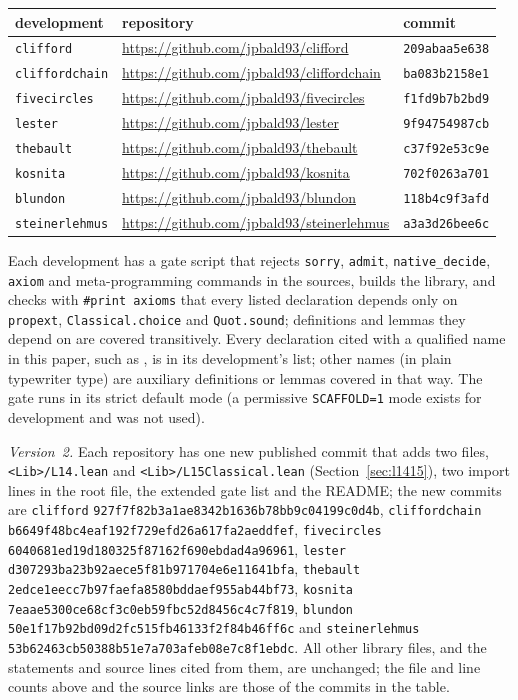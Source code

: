 \documentclass[11pt]{article}
\theoremstyle{definition}
\theoremstyle{remark}
\newcommand{\lean}[1]{\texttt{#1}}
\begin{document}
\begin{center}\small
\begin{tabular}{lll}
\toprule
development & repository & commit\\
\midrule
\lean{clifford} & \url{https://github.com/jpbald93/clifford} & \texttt{209abaa5e638}\\
\lean{cliffordchain} & \url{https://github.com/jpbald93/cliffordchain} & \texttt{ba083b2158e1}\\
\lean{fivecircles} & \url{https://github.com/jpbald93/fivecircles} & \texttt{f1fd9b7b2bd9}\\
\lean{lester} & \url{https://github.com/jpbald93/lester} & \texttt{9f94754987cb}\\
\lean{thebault} & \url{https://github.com/jpbald93/thebault} & \texttt{c37f92e53c9e}\\
\lean{kosnita} & \url{https://github.com/jpbald93/kosnita} & \texttt{702f0263a701}\\
\lean{blundon} & \url{https://github.com/jpbald93/blundon} & \texttt{118b4c9f3afd}\\
\lean{steinerlehmus} & \url{https://github.com/jpbald93/steinerlehmus} & \texttt{a3a3d26bee6c}\\
\bottomrule
\end{tabular}
\end{center}
Each development has a gate script that rejects \lean{sorry}, \lean{admit}, \lean{native\_decide},
\lean{axiom} and meta-programming commands in the sources, builds the library, and checks with
\lean{\#print axioms} that every listed declaration depends only on \lean{propext},
\lean{Classical.choice} and \lean{Quot.sound}; definitions and lemmas they depend on are covered
transitively. Every declaration cited with a qualified name in this paper, such as , is in its development's list;
other names (in plain typewriter type) are auxiliary definitions or lemmas covered in that way.
The gate runs in its strict default mode (a permissive \lean{SCAFFOLD=1} mode exists for development
and was not used).

\emph{Version~2.} Each repository has one new published commit that adds two files, \lean{<Lib>/L14.lean} and
\lean{<Lib>/L15Classical.lean} (Section~\ref{sec:l1415}), two import lines in the root file, the
extended gate list and the README; the new commits are \lean{clifford} \texttt{927f7f82b3a1ae8342b1636b78bb9c04199c0d4b}, \lean{cliffordchain} \texttt{b6649f48bc4eaf192f729efd26a617fa2aeddfef}, \lean{fivecircles} \texttt{6040681ed19d180325f87162f690ebdad4a96961}, \lean{lester} \texttt{d307293ba23b92aece5f81b971704e6e11641bfa}, \lean{thebault} \texttt{2edce1eecc7b97faefa8580bddaef955ab44bf73}, \lean{kosnita} \texttt{7eaae5300ce68cf3c0eb59fbc52d8456c4c7f819}, \lean{blundon} \texttt{50e1f17b92bd09d2fc515fb46133f2f84b46ff6c} and \lean{steinerlehmus} \texttt{53b62463cb50388b51e7a703afeb08e7c8f1ebdc}. All other library files, and
the statements and source lines cited from them, are unchanged; the file and line counts above and
the source links are those of the commits in the table.
\end{document}

